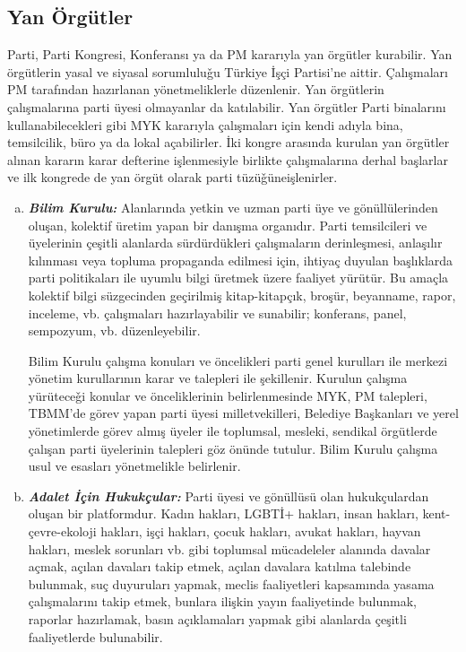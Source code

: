 \documentclass[11pt]{article} %
\begin{document}
\subsection{Yan Örgütler}
Parti, Parti Kongresi, Konferansı ya da PM kararıyla yan örgütler kurabilir. Yan örgütlerin yasal ve siyasal sorumluluǧu Türkiye İşçi Partisi’ne aittir. Çalışmaları PM tarafından hazırlanan yönetmeliklerle düzenlenir. Yan örgütlerin çalışmalarına parti üyesi olmayanlar da katılabilir. Yan örgütler Parti binalarını kullanabilecekleri gibi MYK kararıyla çalışmaları için kendi adıyla bina, temsilcilik, büro ya da lokal açabilirler. İki kongre arasında kurulan yan örgütler alınan kararın karar defterine işlenmesiyle birlikte çalışmalarına derhal başlarlar ve ilk kongrede de yan örgüt olarak parti tüzüǧüneişlenirler.
\begin{enumerate}[a)]
\item \textit{\textbf{Bilim Kurulu:}}
\hfill \break
Alanlarında yetkin ve uzman parti üye ve gönüllülerinden oluşan, kolektif üretim yapan bir danışma organıdır. Parti temsilcileri ve üyelerinin çeşitli alanlarda sürdürdükleri çalışmaların derinleşmesi, anlaşılır kılınması veya topluma propaganda edilmesi için, ihtiyaç duyulan başlıklarda parti politikaları ile uyumlu bilgi üretmek üzere faaliyet yürütür. Bu amaçla kolektif bilgi süzgecinden geçirilmiş kitap-kitapçık, broşür, beyanname, rapor, inceleme, vb. çalışmaları hazırlayabilir ve sunabilir; konferans, panel, sempozyum, vb. düzenleyebilir.

Bilim Kurulu çalışma konuları ve öncelikleri parti genel kurulları ile merkezi yönetim kurullarının karar ve talepleri ile şekillenir. Kurulun çalışma yürüteceǧi konular ve önceliklerinin belirlenmesinde MYK, PM talepleri, TBMM’de görev yapan parti üyesi milletvekilleri, Belediye Başkanları ve yerel yönetimlerde görev almış üyeler ile toplumsal, mesleki, sendikal örgütlerde çalışan parti üyelerinin talepleri göz önünde tutulur. Bilim Kurulu çalışma usul ve esasları yönetmelikle
belirlenir.
\item \textit{\textbf{Adalet İçin Hukukçular:}}
\hfill \break
Parti üyesi ve gönüllüsü olan hukukçulardan oluşan bir platformdur. Kadın hakları, LGBTİ+ hakları, insan hakları, kent-çevre-ekoloji hakları, işçi hakları, çocuk hakları, avukat hakları, hayvan hakları, meslek sorunları vb. gibi toplumsal mücadeleler alanında davalar açmak, açılan davaları takip etmek, açılan davalara katılma talebinde bulunmak, suç duyuruları yapmak, meclis faaliyetleri kapsamında yasama çalışmalarını takip etmek, bunlara ilişkin yayın faaliyetinde bulunmak, raporlar hazırlamak, basın açıklamaları yapmak gibi alanlarda çeşitli faaliyetlerde bulunabilir.
\end{enumerate}
\end{document}
